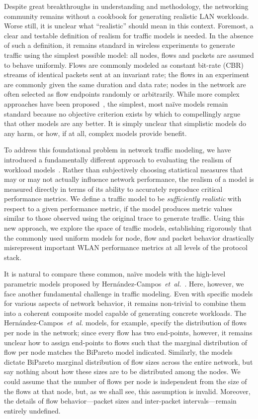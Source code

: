 \documentclass[conference]{IEEEtran}
\newcommand{\caps}[1]{{\small{#1}}}
\newcommand{\FHC}{Hern\'andez-Campos~\textit{et~al.}}
\begin{document}
Despite great breakthroughs in understanding and methodology, the networking community remains without a cookbook for generating realistic \caps{LAN} workloads. Worse still, it is unclear what ``realistic'' should mean in this context. Foremost, a clear and testable definition of realism for traffic models is needed. In the absence of such a definition, it remains standard in wireless experiments to generate traffic using the simplest possible model: all nodes, flows and packets are assumed to behave uniformly. Flows are commonly modeled as constant bit-rate (\caps{CBR}) streams of identical packets sent at an invariant rate; the flows in an experiment are commonly given the same duration and data rate; nodes in the network are often selected as flow endpoints randomly or arbitrarily. While more complex approaches have been proposed~\cite{Sommers04,Avallone04,Avallone06}, %
the simplest, most na\"ive models remain standard because no objective criterion exists by which to compellingly argue that other models are any better. It is simply unclear that simplistic models do any harm, or how, if at all, complex models provide benefit.

To address this foundational problem in network traffic modeling, we have introduced a fundamentally different approach to evaluating the realism of workload models~\cite{Karpinski07:realism,Karpinski07:cbr-failure}. Rather than subjectively choosing statistical measures that may or may not actually influence network performance, the realism of a model is measured directly in terms of its ability to accurately reproduce critical performance metrics. We define a traffic model to be \textit{sufficiently realistic} with respect to a given performance metric, if the model produces metric values similar to those observed using the original trace to generate traffic. Using this new approach, we explore the space of traffic models, establishing rigorously that the commonly used uniform models for node, flow and packet behavior drastically misrepresent important \caps{WLAN} performance metrics at all levels of the protocol stack.

It is natural to compare these common, na\"ive models with the high-level parametric models proposed by \FHC~\cite{Hernandez06:wlan-traffic}. Here, however, we face another fundamental challenge in traffic modeling. Even with specific models for various aspects of network behavior, it remains non-trivial to combine them into a coherent composite model capable of generating concrete workloads. The {\FHC} models, for example, specify the distribution of flows per node in the network; since every flow has two end-points, however, it remains unclear how to assign end-points to flows such that the marginal distribution of flow per node matches the BiPareto model indicated. Similarly, the models dictate BiPareto marginal distribution of flow sizes across the entire network, but say nothing about how these sizes are to be distributed among the nodes. We could assume that the number of flows per node is independent from the size of the flows at that node, but, as we shall see, this assumption is invalid. Moreover, the details of flow behavior---packet sizes and inter-packet intervals---remain entirely undefined.
\end{document}
